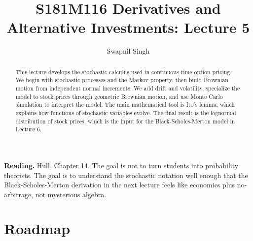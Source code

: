

\title{S181M116 Derivatives and Alternative Investments: Lecture 5}
\author{Swapnil Singh}
\date{}


\setlength{\headheight}{26pt}

\newcommand{\dd}{\,d}
\newcommand{\dt}{\Delta t}
\newcommand{\dz}{\Delta z}
\newcommand{\eps}{\varepsilon}
\newcommand{\R}{\mathbb{R}}
\newcommand{\Prob}{\mathbb{P}}
\newcommand{\Var}{\operatorname{Var}}
\newcommand{\Cov}{\operatorname{Cov}}
\newcommand{\Corr}{\operatorname{Corr}}
\newcommand{\Normal}{\mathcal{N}}
\newcommand{\given}{\,|\,}
\newcommand{\St}{S_T}
\newcommand{\Szero}{S_0}
\newcommand{\Ito}{Ito}


\maketitle

\begin{abstract}
This lecture develops the stochastic calculus used in continuous-time option
pricing. We begin with stochastic processes and the Markov property, then build
Brownian motion from independent normal increments. We add drift and volatility,
specialize the model to stock prices through geometric Brownian motion, and use
Monte Carlo simulation to interpret the model. The main mathematical tool is
\Ito's lemma, which explains how functions of stochastic variables evolve. The
final result is the lognormal distribution of stock prices, which is the input
for the Black-Scholes-Merton model in Lecture 6.
\end{abstract}

\begin{boxD}
\textbf{Reading.} Hull, Chapter 14. The goal is not to turn students into
probability theorists. The goal is to understand the stochastic notation well
enough that the Black-Scholes-Merton derivation in the next lecture feels like
economics plus no-arbitrage, not mysterious algebra.
\end{boxD}

\section{Roadmap}

